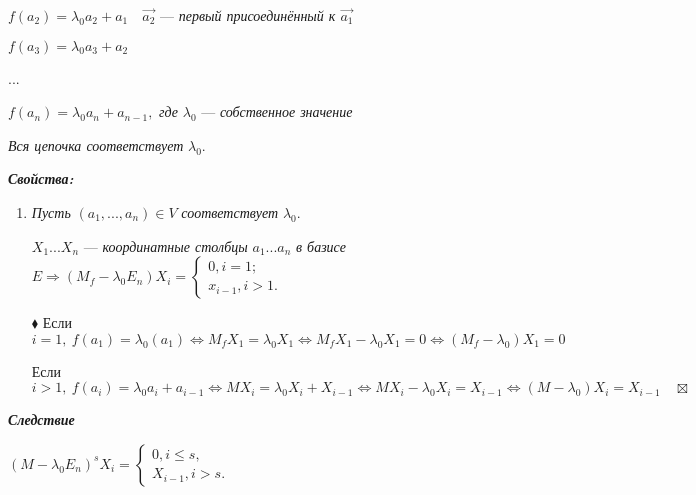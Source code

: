 \documentclass[a4paper, 12pt]{report}
\begin{document}
	$f(a_2) = \lambda_0 a_2 + a_1 \quad \vec{a_2}$ --- \textit{первый присоединённый к $\vec{a_1}$}
	
	$f(a_3) = \lambda_0 a_3 + a_2$
	
	\quad \quad \quad ...
	
	$f(a_n) = \lambda_0 a_n + a_{n-1},$ \textit{где} $\lambda_0$ --- \textit{собственное значение}
	\par\bigskip
	\textit{Вся цепочка соответствует} $\lambda_0$.
	\par\bigskip
	\textit{\textbf{Свойства:}}
	\begin{enumerate}
		\item \textit{Пусть} $(a_1, ..., a_n) \in V$ \textit{соответствует} $\lambda_0$.
		
		$X_1 ... X_n$ --- \textit{координатные столбцы} $a_1...a_n$ \textit{в базисе} $E \Longrightarrow (M_f - \lambda_0 E_n) X_i = \begin{cases}0, i = 1; \\ x_{i-1}, i>1. \end{cases}$
		
		$\blacklozenge$ Если $ i = 1,\ f(a_1) = \lambda_0 (a_1) \Longleftrightarrow M_f X_1 = \lambda_0 X_1 \Longleftrightarrow M_f X_1 - \lambda_0 X_1 = 0 \Longleftrightarrow (M_f -  \lambda_0) X_1 = 0$ 
		
		\quad Если $ i > 1,\ f(a_i) = \lambda_0 a_i + a_{i-1} \Longleftrightarrow M X_i = \lambda_0 X_i + X_{i-1} \Longleftrightarrow M X_i - \lambda_0 X_i = X_{i-1} \Longleftrightarrow (M - \lambda_0) X_i = X_{i-1} \quad \boxtimes$
	\end{enumerate}
	
	\textit{\textbf{Следствие}}
	
	$(M - \lambda_0 E_n)^s X_i = \begin{cases} 0, i \leqslant s, \\ X_{i-1}, i > s. \end{cases}$
	
\end{document}
